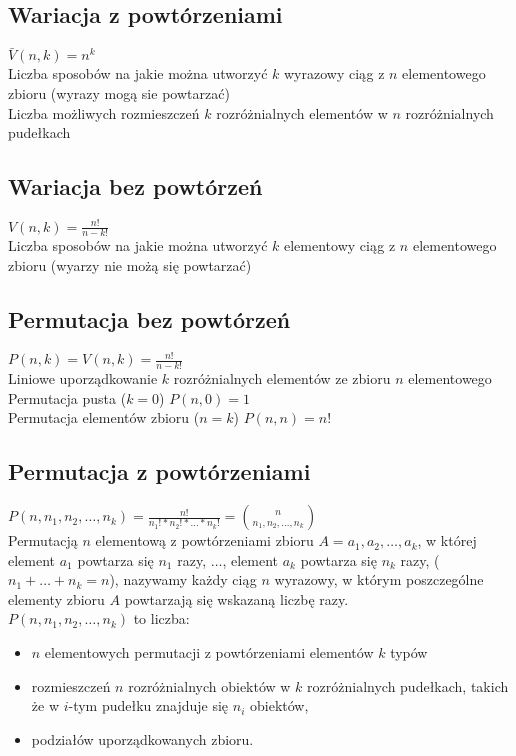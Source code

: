 \documentclass[a4paper,12pt]{article}
\begin{document}
\subsection{Wariacja z powtórzeniami} $\bar V (n, k)=n^k$ \\
Liczba sposobów na jakie można utworzyć $k$ wyrazowy ciąg z $n$ elementowego zbioru (wyrazy mogą sie powtarzać) \\
Liczba możliwych rozmieszczeń $k$ rozróżnialnych elementów w $n$ rozróżnialnych pudełkach 
\subsection{Wariacja bez powtórzeń} $V(n,k)=\frac{n!}{n-k!}$ \\
Liczba sposobów na jakie można utworzyć $k$ elementowy ciąg z $n$ elementowego zbioru (wyarzy nie możą się powtarzać)
\subsection{Permutacja bez powtórzeń} $P(n,k)=V(n,k)=\frac{n!}{n-k!}$\\
Liniowe uporządkowanie $k$ rozróżnialnych elementów ze zbioru $n$ elementowego \\
Permutacja pusta ($k=0$) $P(n,0)=1$ \\
Permutacja elementów zbioru ($n=k$) $P(n, n)=n!$
\subsection{Permutacja z powtórzeniami} $P(n,n_1,n_2,\dots ,n_k)=\frac{n!}{n_1!*n_2!*\dots *n_k!}= {{n}\choose{n_1,n_2,\dots, n_k}}$ \\
Permutacją $n$ elementową z powtórzeniami zbioru  $A=a_1,a_2,\dots,a_k$, w której element $a_1$ powtarza się $n_1$ razy, $\dots$, element $a_k$ powtarza się $n_k$ razy, ($n_1+ \dots + n_k= n$), nazywamy każdy ciąg $n$ wyrazowy, w którym poszczególne elementy zbioru $A$ powtarzają się wskazaną liczbę razy.\\

$P(n,n_1,n_2,\dots ,n_k)$ to liczba: 
\begin{itemize} \itemsep1pt \parskip0pt 
 \item $n$ elementowych permutacji z powtórzeniami elementów $k$ typów
 \item rozmieszczeń $n$ rozróżnialnych obiektów w $k$ rozróżnialnych pudełkach, takich że w $i$-tym pudełku znajduje się $n_i$ obiektów,
 \item podziałów uporządkowanych zbioru.
\end{itemize}
\end{document}
